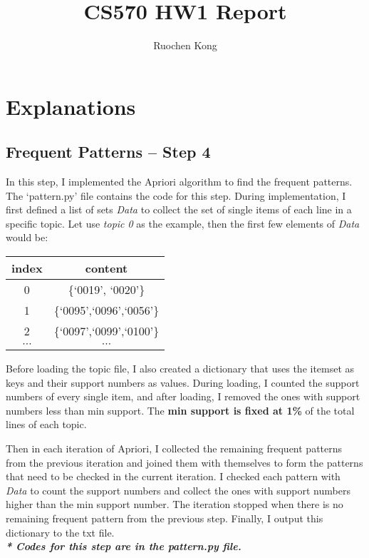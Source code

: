 \documentclass[11pt]{article}
\title{CS570 HW1 Report}
\author{Ruochen Kong}
\begin{document}
\maketitle

\section{Explanations}

\subsection{Frequent Patterns -- Step 4}

In this step, I implemented the Apriori algorithm to find the frequent patterns. The `pattern.py' file contains the code for this step. During implementation, I first defined a list of sets {\it Data} to collect the set of single items of each line in a specific topic. Let use {\it topic 0} as the example, then the first few elements of {\it Data} would be: 

\begin{center}
\begin{tabular}{c|c}
index & content\\
\hline 
0 & \{`0019', `0020'\}\\
1 & \{`0095',`0096',`0056'\}\\
2 & \{`0097',`0099',`0100'\}\\
$\cdots$ & $\cdots$ \\
\end{tabular}
\end{center}


Before loading the topic file, I also created a dictionary that uses the itemset as keys and their support numbers as values. During loading, I counted the support numbers of every single item, and after loading, I removed the ones with support numbers less than min support. The {\bf min support is fixed at 1\%} of the total lines of each topic.

Then in each iteration of Apriori, I collected the remaining frequent patterns from the previous iteration and joined them with themselves to form the patterns that need to be checked in the current iteration. I checked each pattern with {\it Data} to count the support numbers and collect the ones with support numbers higher than the min support number. The iteration stopped when there is no remaining frequent pattern from the previous step. Finally, I output this dictionary to the txt file.\\
\textit{\textbf{* Codes for this step are in the pattern.py file.}}
\end{document}
